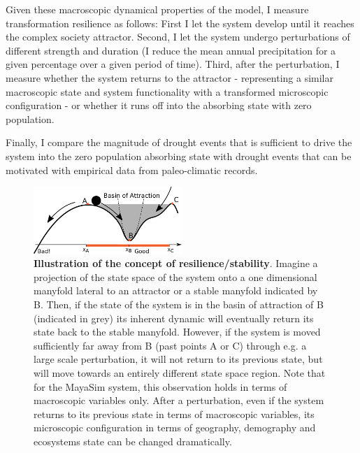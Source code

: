 Given these macroscopic dynamical properties of the model, I measure transformation resilience as follows: First I let the system develop until it reaches the complex society attractor. Second, I let the system undergo perturbations of different strength and duration (I reduce the mean annual precipitation for a given percentage over a given period of time). Third, after the perturbation, I measure whether the system returns to the attractor - representing a similar macroscopic state and system functionality with a transformed microscopic configuration - or whether it runs off into the absorbing state with zero population.

Finally, I compare the magnitude of drought events that is sufficient to drive the system into the zero population absorbing state with drought events that can be motivated with empirical data from paleo-climatic records.

\begin{figure}[!t]
\centering
\includegraphics[width=0.5\textwidth]{figures/Basin_Stability.pdf}
\caption[Sketch to ilustrate the concept of persistence resilience.]{\textbf{Illustration of the concept of resilience/stability}. Imagine a projection of the state space of the system onto a one dimensional manyfold lateral to an attractor or a stable manyfold indicated by B. Then, if the state of the system is in the basin of attraction of B (indicated in grey) its inherent dynamic will eventually return its state back to the stable manyfold. However, if the system is moved sufficiently far away from B (past points A or C) through e.g. a large scale perturbation, it will not return to its previous state, but will move towards an entirely different state space region. Note that for the MayaSim system, this observation holds in terms of macroscopic variables only. After a perturbation, even if the system returns to its previous state in terms of macroscopic variables, its microscopic configuration in terms of geography, demography and ecosystems state can be changed dramatically.}
\label{fig:basin_stability}
\end{figure}

